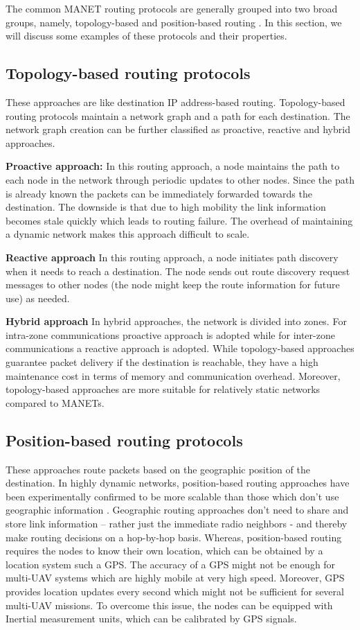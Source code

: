 The common MANET routing protocols are generally grouped into two broad groups, namely, topology-based and position-based routing \cite{6238283}. In this section, we will discuss some examples of these protocols and their properties.

\subsection{Topology-based routing protocols}
These approaches are like destination IP address-based routing. Topology-based routing protocols maintain a network graph and a path for each destination. The network graph creation can be further classified as proactive, reactive and hybrid approaches. 

\textbf{Proactive approach:} In this routing approach, a node maintains the path to each node in the network through periodic updates to other nodes. Since the path is already known the packets can be immediately forwarded towards the destination. The downside is that due to high mobility the link information becomes stale quickly which leads to routing failure. The overhead of maintaining a dynamic network makes this approach difficult to scale.

\textbf{Reactive approach} In this routing approach, a node initiates path discovery when it needs to reach a destination. The node sends out route discovery request messages to other nodes (the node might keep the route information for future use) as needed. 

\textbf{Hybrid approach} In hybrid approaches, the network is divided into zones. For intra-zone communications proactive approach is adopted while for inter-zone communications a reactive approach is adopted. 
While topology-based approaches guarantee packet delivery if the destination is reachable, they have a high maintenance cost in terms of memory and communication overhead. Moreover, topology-based approaches are more suitable for relatively static networks compared to MANETs.

\subsection{Position-based routing protocols}
These approaches route packets based on the geographic position of the destination. In highly dynamic networks, position-based routing approaches have been experimentally confirmed to be more scalable than those which don't use geographic information \cite{Stojmenovic:2002:PRA:2288474.2290160}. Geographic routing approaches don't need to share and store link information – rather just the immediate radio neighbors - and thereby make routing decisions on a hop-by-hop basis. Whereas, position-based routing requires the nodes to know their own location, which can be obtained by a location system such a GPS. The accuracy of a GPS might not be enough for multi-UAV systems which are highly mobile at very high speed. Moreover, GPS provides location updates every second which might not be sufficient for several multi-UAV missions. To overcome this issue, the nodes can be equipped with Inertial measurement units, which can be calibrated by GPS signals.


